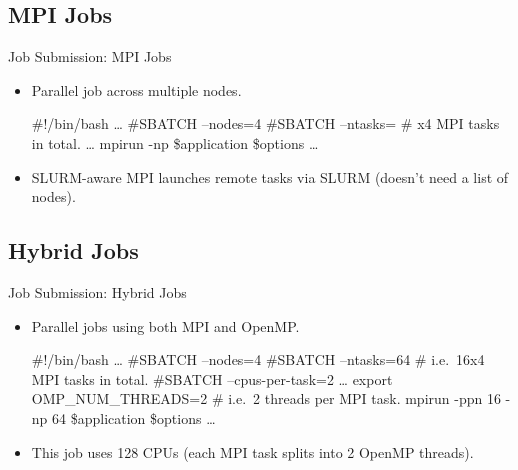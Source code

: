 \subsection{MPI Jobs}
\begin{frame}[fragile]{Job Submission: MPI Jobs}
\begin{itemize}
\item{Parallel job across multiple nodes.}
\begin{semiverbatim}
\scriptsize
#!/bin/bash
\ldots
#SBATCH --nodes={\color{red}4}
#SBATCH --ntasks=\alert{}     # x{\color{red}4} MPI tasks in total.
\ldots
mpirun -np \alert{} \$application \$options
\ldots
\end{semiverbatim}
\item<3-|handout:2->{\small \alert{SLURM-aware MPI} launches remote tasks via SLURM (doesn't need a list of nodes).}
\end{itemize}
\end{frame}

\subsection{Hybrid Jobs}
\begin{frame}[fragile]{Job Submission: Hybrid Jobs}
\begin{itemize}
\item{Parallel jobs using both MPI and OpenMP.}
\begin{semiverbatim}
\scriptsize
#!/bin/bash
\ldots
#SBATCH --nodes={\color{red}4}
#SBATCH --ntasks=\alert{64}     # i.e.\ {\color[rgb]{0,0.8,0}16}x{\color{red}4} MPI tasks in total.
#SBATCH --cpus-per-task={\color{brown}2}
\ldots
{\color{brown}export OMP\_NUM\_THREADS=2   # i.e.\ 2 threads per MPI task.}
mpirun -ppn {\color[rgb]{0,0.8,0}16} -np \alert{64} \$application \$options
\ldots
\end{semiverbatim}
\item<2->{\small This job uses \alert{128 CPUs} (each MPI task splits into 2 OpenMP threads).}
\end{itemize}
\end{frame}


